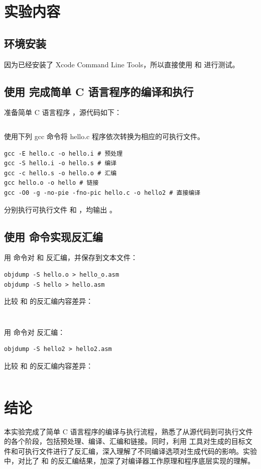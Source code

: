 \documentclass[12pt, a4paper]{ctexart}
\begin{document}
\section{实验内容}

\subsection{环境安装}

因为已经安装了 Xcode Command Line Tools，所以直接使用  和  进行测试。

\subsection{使用  完成简单 C 语言程序的编译和执行}

准备简单 C 语言程序 ，源代码如下：

\inputminted{c}{../src/hello.c}

使用下列 gcc 命令将 hello.c 程序依次转换为相应的可执行文件。

\begin{verbatim}
gcc -E hello.c -o hello.i # 预处理
gcc -S hello.i -o hello.s # 编译
gcc -c hello.s -o hello.o # 汇编
gcc hello.o -o hello # 链接
gcc -O0 -g -no-pie -fno-pic hello.c -o hello2 # 直接编译
\end{verbatim}

分别执行可执行文件  和 ，均输出 。

\subsection{使用  命令实现反汇编}

用  命令对  和  反汇编，并保存到文本文件：

\begin{verbatim}
objdump -S hello.o > hello_o.asm
objdump -S hello > hello.asm
\end{verbatim}

比较  和  的反汇编内容差异：

\inputminted{text}{../res/hello_o.asm}

\inputminted{text}{../res/hello.asm}

用  命令对  反汇编：

\begin{verbatim}
objdump -S hello2 > hello2.asm
\end{verbatim}

比较  和  的反汇编内容差异：

\inputminted{text}{../res/hello2.asm}

\section{结论}

本实验完成了简单 C 语言程序的编译与执行流程，熟悉了从源代码到可执行文件的各个阶段，包括预处理、编译、汇编和链接。同时，利用  工具对生成的目标文件和可执行文件进行了反汇编，深入理解了不同编译选项对生成代码的影响。实验中，对比了  和  的反汇编结果，加深了对编译器工作原理和程序底层实现的理解。
\end{document}
